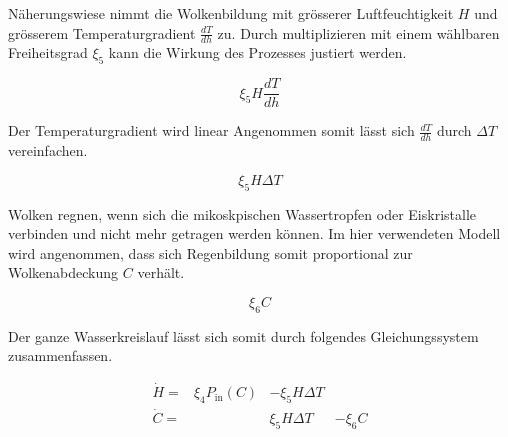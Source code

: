 \begin{refsection}
Näherungswiese nimmt die Wolkenbildung mit grösserer Luftfeuchtigkeit $H$ und grösserem Temperaturgradient $\frac{dT}{dh}$ zu. Durch multiplizieren mit einem wählbaren Freiheitsgrad $\xi_5$ kann die Wirkung des Prozesses justiert werden. 

\begin{equation}
\xi_5 H \frac{dT}{dh}
\end{equation}

Der Temperaturgradient wird linear Angenommen somit lässt sich $\frac{dT}{dh}$ durch $\Delta T $ vereinfachen. 

\begin{equation}
\xi_5 H \Delta T
\end{equation}

Wolken regnen, wenn sich die mikoskpischen Wassertropfen oder Eiskristalle verbinden und nicht mehr getragen werden können. Im hier verwendeten Modell wird angenommen, dass sich Regenbildung somit proportional zur Wolkenabdeckung $C$ verhält.

\begin{equation}
\xi_6 C
\end{equation}


Der ganze Wasserkreislauf lässt sich somit durch folgendes Gleichungssystem zusammenfassen.

\begin{equation}
	\begin{matrix}			
		\dot{H} = & \xi_4 P_{\text{in}}(C) & - \xi_5 H \Delta T & \\
		\dot{C} = &                       &   \xi_5 H \Delta T & - \xi_6 C
	\end{matrix}	
\end{equation}



\end{refsection}
